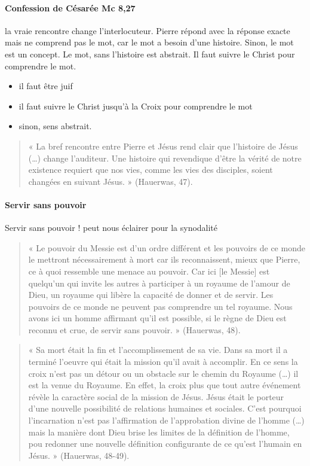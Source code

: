 \paragraph{Confession de Césarée Mc 8,27} la vraie rencontre change l'interlocuteur. Pierre répond avec la réponse exacte mais ne comprend pas le mot, car le mot a besoin d'une histoire. Sinon, le mot est un concept. Le mot, sans l'histoire est abstrait. Il faut suivre le Christ pour comprendre le mot. 
\begin{itemize}
    \item il faut être juif
    \item il faut suivre le Christ jusqu'à la Croix pour comprendre le mot
    \item sinon, sens abstrait.
\end{itemize}
\begin{quote}
    « La bref rencontre entre Pierre et Jésus rend clair que l’histoire de Jésus (…) change l’auditeur. Une
histoire qui revendique d’être la vérité de notre existence requiert que nos vies, comme les vies des
disciples, soient changées en suivant Jésus. » (Hauerwas, 47).
\end{quote}

\paragraph{Servir sans pouvoir}
\begin{Synthesis}
Servir sans pouvoir ! peut nous éclairer pour la synodalité
\end{Synthesis}
\begin{quote}
    « Le pouvoir du Messie est d’un ordre différent et les pouvoirs de ce monde le mettront
nécessairement à mort car ils reconnaissent, mieux que Pierre, ce à quoi ressemble une menace au
pouvoir. Car ici [le Messie] est quelqu’un qui invite les autres à participer à un royaume de l’amour de
Dieu, un royaume qui libère la capacité de donner et de servir. Les pouvoirs de ce monde ne peuvent
pas comprendre un tel royaume. Nous avons ici un homme affirmant qu’il est possible, si le règne de
Dieu est reconnu et crue, de servir sans pouvoir. » (Hauerwas, 48).
\end{quote}

\begin{quote}
    « Sa mort était la fin et l’accomplissement de sa vie. Dans sa mort il a terminé l’oeuvre qui était la
mission qu’il avait à accomplir. En ce sens la croix n’est pas un détour ou un obstacle sur le chemin du
Royaume (…) il est la venue du Royaume. En effet, la croix plus que tout autre événement révèle la
caractère social de la mission de Jésus. Jésus était le porteur d’une nouvelle possibilité de relations
humaines et sociales. C’est pourquoi l’incarnation n’est pas l’affirmation de l’approbation divine de
l’homme (…) mais la manière dont Dieu brise les limites de la définition de l’homme, pou redonner
une nouvelle définition configurante de ce qu’est l’humain en Jésus. » (Hauerwas, 48-49).
\end{quote}


